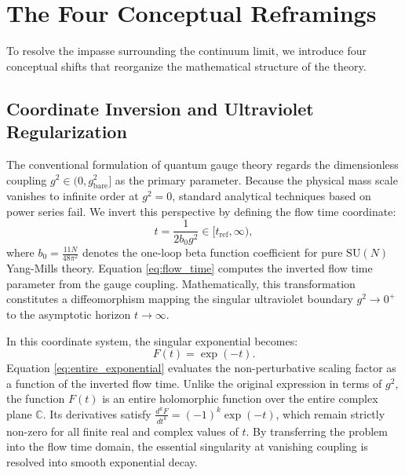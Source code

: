 \documentclass[11pt,reqno]{amsart}
\theoremstyle{plain}
\theoremstyle{definition}
\theoremstyle{remark}
\numberwithin{equation}{section}
\begin{document}
\section{The Four Conceptual Reframings}

To resolve the impasse surrounding the continuum limit, we introduce four conceptual shifts that reorganize the mathematical structure of the theory.

\subsection{Coordinate Inversion and Ultraviolet Regularization}
The conventional formulation of quantum gauge theory regards the dimensionless coupling $g^2 \in (0, g_{\mathrm{bare}}^2]$ as the primary parameter. Because the physical mass scale vanishes to infinite order at $g^2 = 0$, standard analytical techniques based on power series fail. We invert this perspective by defining the flow time coordinate:
\begin{equation}
\label{eq:flow_time}
t = \frac{1}{2 b_0 g^2} \in [t_{\mathrm{ref}}, \infty),
\end{equation}
where $b_0 = \frac{11 N}{48 \pi^2}$ denotes the one-loop beta function coefficient for pure $\mathrm{SU}(N)$ Yang-Mills theory. Equation \eqref{eq:flow_time} computes the inverted flow time parameter from the gauge coupling. Mathematically, this transformation constitutes a diffeomorphism mapping the singular ultraviolet boundary $g^2 \to 0^+$ to the asymptotic horizon $t \to \infty$.

In this coordinate system, the singular exponential becomes:
\begin{equation}
\label{eq:entire_exponential}
F(t) = \exp(-t).
\end{equation}
Equation \eqref{eq:entire_exponential} evaluates the non-perturbative scaling factor as a function of the inverted flow time. Unlike the original expression in terms of $g^2$, the function $F(t)$ is an entire holomorphic function over the entire complex plane $\mathbb{C}$. Its derivatives satisfy $\frac{d^k F}{d t^k} = (-1)^k \exp(-t)$, which remain strictly non-zero for all finite real and complex values of $t$. By transferring the problem into the flow time domain, the essential singularity at vanishing coupling is resolved into smooth exponential decay.
\end{document}
